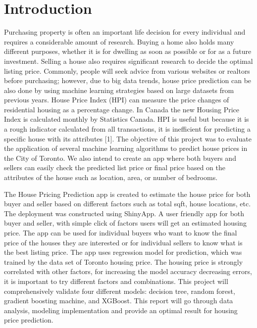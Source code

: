 \documentclass[11pt,]{article}
\begin{document}
\vskip -8.5pt



\noindent  

\hypertarget{introduction}{%
\section{Introduction}\label{introduction}}

Purchasing property is often an important life decision for every
individual and requires a considerable amount of research. Buying a home
also holds many different purposes, whether it is for dwelling as soon
as possible or for as a future investment. Selling a house also requires
significant research to decide the optimal listing price. Commonly,
people will seek advice from various websites or realtors before
purchasing; however, due to big data trends, house price prediction can
be also done by using machine learning strategies based on large
datasets from previous years. House Price Index (HPI) can measure the
price changes of residential housing as a percentage change. In Canada
the new Housing Price Index is calculated monthly by Statistics Canada.
HPI is useful but because it is a rough indicator calculated from all
transactions, it is inefficient for predicting a specific house with its
attributes {[}1{]}. The objective of this project was to evaluate the
application of several machine learning algorithms to predict house
prices in the City of Toronto. We also intend to create an app where
both buyers and sellers can easily check the predicted list price or
final price based on the attributes of the house such as location, area,
or number of bedrooms.

The House Pricing Prediction app is created to estimate the house price
for both buyer and seller based on different factors such as total sqft,
house locations, etc. The deployment was constructed using ShinyApp. A
user friendly app for both buyer and seller, with simple click of
factors users will get an estimated housing price. The app can be used
for individual buyers who want to know the final price of the houses
they are interested or for individual sellers to know what is the best
listing price. The app uses regression model for prediction, which was
trained by the data set of Toronto housing price. The housing price is
strongly correlated with other factors, for increasing the model
accuracy decreasing errors, it is important to try different factors and
combinations. This project will comprehensively validate four different
models: decision tree, random forest, gradient boosting machine, and
XGBoost. This report will go through data analysis, modeling
implementation and provide an optimal result for housing price
prediction.
\end{document}
